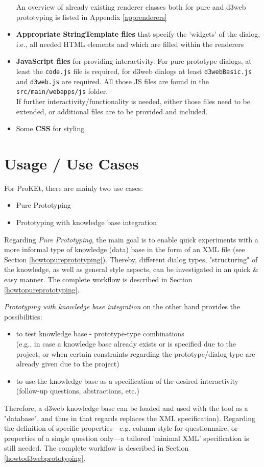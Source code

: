 \documentclass[a4paper,10pt]{scrreprt}
\begin{document}
\begin{itemize}
	An overview of already existing renderer classes both for pure and d3web prototyping is listed in Appendix \ref{apprenderers} 
	\item \textbf{Appropriate StringTemplate files} that specify the 'widgets' of the dialog, i.e., all needed HTML elements  and which are filled within the renderers 
	\item \textbf{JavaScript files} for providing interactivity. 
	For pure prototype dialogs, at least the \texttt{code.js} file is required, for d3web dialogs at least \texttt{d3webBasic.js} and \texttt{d3web.js} are required. All those JS files are found in the \texttt{src/main/webapps/js} folder.\\
	If further interactivity/functionality is needed, either those files need to be extended, or additional files are to be provided and included.
	\item Some \textbf{CSS} for styling	
\end{itemize}

\section{Usage / Use Cases}
For ProKEt, there are mainly two use cases:
\begin{itemize}
	\item Pure Prototyping
	\item Prototyping with knowledge base integration
\end{itemize}
Regarding \textit{Pure Prototyping}, the main goal is to enable quick experiments with a more informal type of 
knowledge (data) base in the form of an XML file (see Section \ref{howtopureprototyping}). Thereby, different dialog types, 
"structuring" of the knowledge, as well as general style aspects, can be investigated in an quick \& 
easy manner. The complete workflow is described in Section \ref{howtopureprototyping}.\par
\textit{Prototyping with knowledge base integration} on the other hand provides the possibilities:
\begin{itemize}
	\item to test knowledge base - prototype-type combinations \\
	(e.g., in case a knowledge base already exists or is specified due to the project, or when certain 
	constraints regarding the prototype/dialog type are already given due to the project)
	\item to use the knowledge base as a specification of the desired interactivity (follow-up questions,
	abstractions, etc.)
\end{itemize}
Therefore, a d3web knowledge base can be loaded and used with the tool as a 
"database", and thus in that regards replaces the XML specification). Regarding the definition of specific properties---e.g.
 column-style for questionnaire, or properties of a single question only---a tailored 'minimal XML' specification is still needed. The
complete workflow is described in Section \ref{howtod3webprototyping}.
\end{document}
